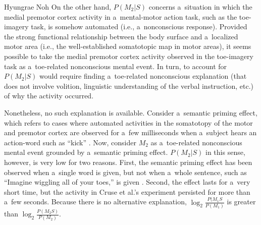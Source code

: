 \begin{artengenv}{Hyungrae Noh}
On the other hand, $P(M_2 | S)$ concerns a~situation in which the medial premotor cortex activity in a~mental-motor action task, such as the toe-imagery task, is somehow automated (i.e., a~nonconscious response). Provided the strong functional relationship between the body surface and a~localized motor area (i.e., the well-established somatotopic map in motor areas), it seems possible to take the medial premotor cortex activity observed in the toe-imagery task as a~toe-related nonconscious mental event. In turn, to account for $P(M_2 | S)$ would require finding a~toe-related nonconscious explanation (that does not involve volition, linguistic understanding of the verbal instruction, etc.) of why the activity occurred.

Nonetheless, no such explanation is available. Consider a~semantic priming effect, which refers to cases where automated activities in the somatotopy of the motor and premotor cortex are observed for a~few milliseconds when a~subject hears an action-word such as ``kick''
\parencite[][]{pulvermuller_brain_2005}. %
 Now, consider $M_2$ as a~toe-related nonconscious mental event grounded by a~semantic priming effect. $P(M_2 | S)$ in this sense, however, is very low for two reasons. First, the semantic priming effect has been observed when a~single word is given, but not when a~whole sentence, such as ``Imagine wiggling all of your toes,'' is given 
\parencite[][]{raposo_modulation_2009}. %
 Second, the effect lasts for a~very short time, but the activity in Cruse et al.'s experiment persisted for more than a~few seconds. Because there is no alternative explanation, $\log _2\frac{P(M_1S}{P(M_1)}$ is greater than $\log _2\frac{P(M_2S)}{P(M_2)}$.


\end{artengenv}

